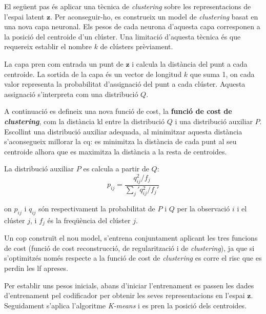 \documentclass[CAT,BIB]{TFUOC}%
\begin{document}
        El següent pas és aplicar una tècnica de \textit{clustering}
        sobre les representacions de l'espai latent $\mathbf{z}$.
        Per aconseguir-ho,
        es construeix un model de \textit{clustering}
        basat en una nova capa neuronal.
        Els pesos de cada neurona d'aquesta capa
        corresponen a la posició del centroide d'un clúster.
        Una limitació d'aquesta tècnica és que requereix
        establir el nombre $k$ de clústers prèviament.

        La capa pren com entrada un punt de $\mathbf{z}$
        i calcula la distància del punt a cada centroide.
        La sortida de la capa és un vector de longitud $k$ que suma 1,
        on cada valor representa la probabilitat d'assignació del punt a cada clúster.
        Aquesta assignació s'interpreta com una distribució $Q$.

        A continuació es defineix una nova funció de cost,
        la \textbf{funció de cost de \textit{clustering}},
        com la distància \gls{kl} entre la distribució $Q$
        i una distribució auxiliar $P$.
        Escollint una distribució auxiliar adequada,
        al minimitzar aquesta distància
        s'aconsegueix millorar la \gls{cq}:
        es minimitza la distància de cada punt al seu centroide
        alhora que es maximitza la distància a la resta de centroides.

        La distribució auxiliar $P$ es calcula
        a partir de $Q$:
        \begin{equation}
            \label{eq:clustering_aux}
            p_{ij} =
            \frac {q_{ij}^2 / f_j}
                 {\sum_j' q_{ij}^2 / f_j'}
        \end{equation}

        on $p_{ij}$ i $q_{ij}$ són respectivament la probabilitat
        de $P$ i $Q$ per la observació $i$ i el clúster $j$,
        i $f_j$ és la freqüència del clúster $j$.

        Un cop construït el nou model,
        s'entrena conjuntament aplicant les tres funcions de cost
        (funció de cost reconstrucció, de regularització i de \textit{clustering}),
        ja que si s'optimitzés només respecte a la funció de cost de \textit{clustering}
        es corre el risc que es perdin les \gls{lf} apreses.

        Per establir uns pesos inicials,
        abans d'iniciar l'entrenament
        es passen les dades d'entrenament pel codificador
        per obtenir les seves representacions en l'espai $\mathbf{z}$.
        Seguidament s'aplica l'algoritme \textit{K-means}
        i es pren la posició dels centroides.
\end{document}
